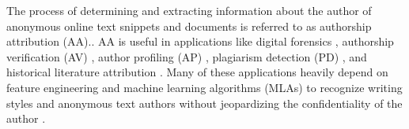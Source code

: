 \documentclass[conference]{IEEEtran}
\begin{document}
The process of determining and extracting information about the author of anonymous online text snippets and documents is referred to as authorship attribution (AA).\cite{modupe2022post}. AA is useful in applications like digital forensics \cite{modupe2011exploring}, authorship verification (AV) \cite{nirkhi2016authorship}, author profiling (AP) \cite{fabien2020bertaa}, plagiarism detection (PD) \cite{foltynek2019academic}, and historical literature attribution \cite{neal2017surveying}. Many of these applications heavily depend on feature engineering and machine learning algorithms (MLAs) \cite{stamatatos2009survey,ding2017learning,vosoughi2016tweet2vec,wu2021exploring} to recognize writing styles and anonymous text authors without jeopardizing the confidentiality of the author \cite{altakrori2018arabic}.
\end{document}
